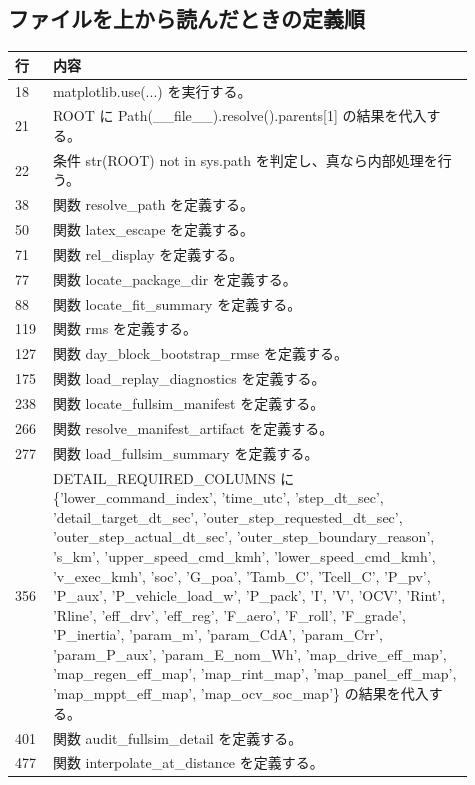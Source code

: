 \documentclass[a4paper,11pt]{article}
\begin{document}
        \subsection*{ファイルを上から読んだときの定義順}
            \begin{longtable}{p{0.07\linewidth} p{0.84\linewidth}}
            \toprule
            行 & 内容 \\
            \midrule
            18 & matplotlib.use(...) を実行する。 \\
21 & ROOT に Path(\_\_file\_\_).resolve().parents[1] の結果を代入する。 \\
22 & 条件 str(ROOT) not in sys.path を判定し、真なら内部処理を行う。 \\
38 & 関数 resolve\_path を定義する。 \\
50 & 関数 latex\_escape を定義する。 \\
71 & 関数 rel\_display を定義する。 \\
77 & 関数 locate\_package\_dir を定義する。 \\
88 & 関数 locate\_fit\_summary を定義する。 \\
119 & 関数 rms を定義する。 \\
127 & 関数 day\_block\_bootstrap\_rmse を定義する。 \\
175 & 関数 load\_replay\_diagnostics を定義する。 \\
238 & 関数 locate\_fullsim\_manifest を定義する。 \\
266 & 関数 resolve\_manifest\_artifact を定義する。 \\
277 & 関数 load\_fullsim\_summary を定義する。 \\
356 & DETAIL\_REQUIRED\_COLUMNS に \{'lower\_command\_index', 'time\_utc', 'step\_dt\_sec', 'detail\_target\_dt\_sec', 'outer\_step\_requested\_dt\_sec', 'outer\_step\_actual\_dt\_sec', 'outer\_step\_boundary\_reason', 's\_km', 'upper\_speed\_cmd\_kmh', 'lower\_speed\_cmd\_kmh', 'v\_exec\_kmh', 'soc', 'G\_poa', 'Tamb\_C', 'Tcell\_C', 'P\_pv', 'P\_aux', 'P\_vehicle\_load\_w', 'P\_pack', 'I', 'V', 'OCV', 'Rint', 'Rline', 'eff\_drv', 'eff\_reg', 'F\_aero', 'F\_roll', 'F\_grade', 'P\_inertia', 'param\_m', 'param\_CdA', 'param\_Crr', 'param\_P\_aux', 'param\_E\_nom\_Wh', 'map\_drive\_eff\_map', 'map\_regen\_eff\_map', 'map\_rint\_map', 'map\_panel\_eff\_map', 'map\_mppt\_eff\_map', 'map\_ocv\_soc\_map'\} の結果を代入する。 \\
401 & 関数 audit\_fullsim\_detail を定義する。 \\
477 & 関数 interpolate\_at\_distance を定義する。 \\

\end{longtable}
\end{document}
